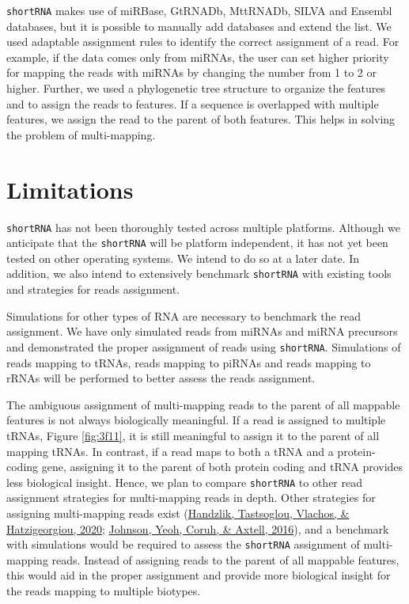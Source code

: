 \documentclass[12pt,twoside]{reedthesis}
\begin{document}
\texttt{shortRNA} makes use of miRBase, GtRNADb, MttRNADb, SILVA and Ensembl
databases, but it is possible to manually add databases and extend the
list. We used adaptable assignment rules to identify the correct
assignment of a read. For example, if the data comes only from miRNAs,
the user can set higher priority for mapping the reads with miRNAs by
changing the number from 1 to 2 or higher. Further, we used a
phylogenetic tree structure to organize the features and to assign the
reads to features. If a sequence is overlapped with multiple features,
we assign the read to the parent of both features. This helps in solving
the problem of multi-mapping.

\hypertarget{limitations}{%
\section{Limitations}\label{limitations}}

\texttt{shortRNA} has not been thoroughly tested across multiple platforms.
Although we anticipate that the \texttt{shortRNA} will be platform independent,
it has not yet been tested on other operating systems. We intend to do
so at a later date. In addition, we also intend to extensively benchmark
\texttt{shortRNA} with existing tools and strategies for reads assignment.

Simulations for other types of RNA are necessary to benchmark the read
assignment. We have only simulated reads from miRNAs and miRNA
precursors and demonstrated the proper assignment of reads using
\texttt{shortRNA}. Simulations of reads mapping to tRNAs, reads mapping to
piRNAs and reads mapping to rRNAs will be performed to better assess the
reads assignment.

The ambiguous assignment of multi-mapping reads to the parent of all
mappable features is not always biologically meaningful. If a read is
assigned to multiple tRNAs, Figure \ref{fig:3f11}, it is still
meaningful to assign it to the parent of all mapping tRNAs. In contrast,
if a read maps to both a tRNA and a protein-coding gene, assigning it to
the parent of both protein coding and tRNA provides less biological
insight. Hence, we plan to compare \texttt{shortRNA} to other read assignment
strategies for multi-mapping reads in depth. Other strategies for
assigning multi-mapping reads exist (\protect\hyperlink{ref-handzlik2020}{Handzlik, Tastsoglou, Vlachos, \& Hatzigeorgiou, 2020}; \protect\hyperlink{ref-johnson2016}{Johnson, Yeoh, Coruh, \& Axtell, 2016}), and a
benchmark with simulations would be required to assess the \texttt{shortRNA}
assignment of multi-mapping reads. Instead of assigning reads to the
parent of all mappable features, this would aid in the proper assignment
and provide more biological insight for the reads mapping to multiple
biotypes.
\end{document}
